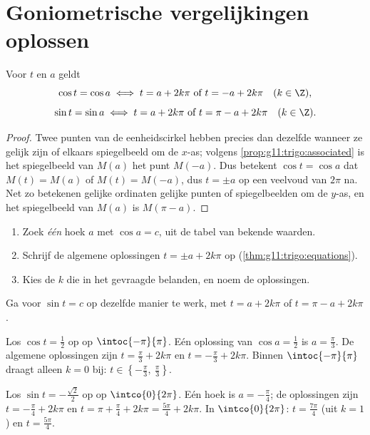 \section{Goniometrische vergelijkingen oplossen}

\begin{theorem}[De vergelijkingen $\cos t = \cos a$ en $\sin t = \sin a$]
\label{thm:g11:trigo:equations}
Voor  $t$ en $a$ geldt
\[
\cos t = \cos a \iff t = a + 2k\pi \ \text{of}\ t = -a + 2k\pi
\quad (k \in \Z),
\]
\[
\sin t = \sin a \iff t = a + 2k\pi \ \text{of}\ t = \pi - a + 2k\pi
\quad (k \in \Z).
\]
\end{theorem}

\begin{proof}
Twee punten van de eenheidscirkel hebben precies dan dezelfde  wanneer
ze gelijk zijn of elkaars spiegelbeeld om de $x$-as; volgens
\cref{prop:g11:trigo:associated} is het spiegelbeeld van $M(a)$ het punt
$M(-a)$. Dus betekent $\cos t = \cos a$ dat $M(t) = M(a)$ of
$M(t) = M(-a)$, dus $t = \pm a$ op een veelvoud van $2\pi$ na. Net zo
betekenen gelijke ordinaten gelijke punten of spiegelbeelden om de $y$-as,
en het spiegelbeeld van $M(a)$ is $M(\pi - a)$.
\end{proof}

\begin{method}[$\cos t = c$ oplossen op een interval]\label{met:g11:trigo:solve}
\begin{enumerate}
  \item Zoek \emph{één} hoek $a$ met $\cos a = c$, uit de tabel van bekende
        waarden.
  \item Schrijf de algemene oplossingen $t = \pm a + 2k\pi$ op
        (\cref{thm:g11:trigo:equations}).
  \item Kies de  $k$ die in het gevraagde  belanden,
        en noem de oplossingen.
\end{enumerate}
Ga voor $\sin t = c$ op dezelfde manier te werk, met $t = a + 2k\pi$ of
$t = \pi - a + 2k\pi$.
\end{method}

\begin{example}\label{ex:g11:trigo:solve}
Los $\cos t = \frac12$ op op $\intoc{-\pi}{\pi}$. Eén oplossing van
$\cos a = \frac12$ is $a = \frac{\pi}{3}$. De algemene oplossingen zijn
$t = \frac\pi3 + 2k\pi$ en $t = -\frac\pi3 + 2k\pi$. Binnen
$\intoc{-\pi}{\pi}$ draagt alleen $k = 0$ bij:
$t \in \left\{-\frac\pi3,\ \frac\pi3\right\}$.

Los $\sin t = -\frac{\sqrt2}{2}$ op op $\intco{0}{2\pi}$. Eén hoek is
$a = -\frac\pi4$; de oplossingen zijn $t = -\frac\pi4 + 2k\pi$ en
$t = \pi + \frac\pi4 + 2k\pi = \frac{5\pi}{4} + 2k\pi$. In
$\intco{0}{2\pi}$: $t = \frac{7\pi}{4}$ (uit $k = 1$) en
$t = \frac{5\pi}{4}$.
\end{example}

